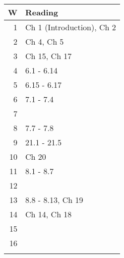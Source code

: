 \documentclass[11pt]{article}
\begin{document}
\small
\begin{center}
\begin{tabular}{rl}
\hline
\textbf{W} & \textbf{Reading}\\
\hline
1 & Ch 1 (Introduction), Ch 2\\
\hline
2 & Ch 4, Ch 5\\
\hline
3 & Ch 15, Ch 17\\
\hline
4 & 6.1 - 6.14\\
\hline
5 & 6.15 - 6.17\\
\hline
6 & 7.1 - 7.4\\
\hline
7 & \\
\hline
8 & 7.7 - 7.8\\
\hline
9 & 21.1 - 21.5\\
\hline
10 & Ch 20\\
\hline
11 & 8.1 - 8.7\\
\hline
12 & \\
\hline
13 & 8.8 - 8.13, Ch 19\\
\hline
14 & Ch 14, Ch 18\\
\hline
15 & \\
\hline
16 & \\
 & \\
\hline
\end{tabular}
\end{center}
\end{document}
